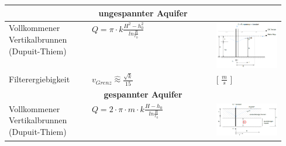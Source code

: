 \begin{landscape}
\begin{minipage}{0.6\linewidth}
\begin{itemize}
	\end{itemize}

%
		\begin{tabular}{p{0.3\linewidth}|l|p{0.25\linewidth}}
					
			\multicolumn{3}{c|}{ \textbf{ungespannter Aquifer} } \\ \hline
			
			Vollkommener Vertikalbrunnen (Dupuit-Thiem) & $ Q = \pi \cdot k \frac{H^2 - h_0^2}{ln \frac{R}{r_0} } $	& \smallskip \includegraphics[width=\linewidth]{images/GW9ungespAquifer.PNG}  \\
			Filterergiebigkeit & $ v_{Grenz} \hat{\approx} \frac{\sqrt{k}}{15}$	& [ $ \frac{m}{s} $ ] \\ \hline
			
			\multicolumn{3}{c|}{ \textbf{gespannter Aquifer} } \\ \hline
			
			Vollkommener Vertikalbrunnen (Dupuit-Thiem) & $ Q = 2 \cdot \pi \cdot m \cdot k \frac{H - h_0}{ln \frac{R}{r_0} } $	& \smallskip \includegraphics[width=\linewidth]{images/GW10gespAquifer.PNG}  \\ \hline
			

\end{tabular}
\end{minipage}
\end{landscape}
